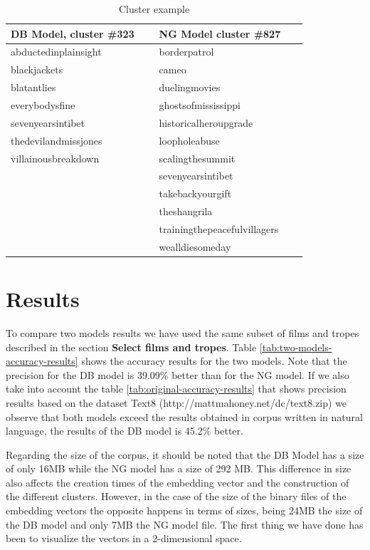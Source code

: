 \documentclass[letterpaper]{article}
\begin{document}
	
	\begin{table}[t]
	\centering
	\begin{tabular}{|p{0.45\linewidth}|p{0.45\linewidth}|}
	\hline
	\textbf{DB Model, cluster \#323} & \textbf{NG Model cluster \#827}\\
	\hline
	\hline
	abductedinplainsight  & borderpatrol \\
	blackjackets  & cameo \\
	blatantlies  & duelingmovies \\
	everybodysfine  & ghostsofmississippi \\
	sevenyearsintibet  & historicalheroupgrade \\
	thedevilandmissjones  & loopholeabuse  \\
	villainousbreakdown  & scalingthesummit  \\
	 & sevenyearsintibet \\
	 & takebackyourgift \\
	 & theshangrila \\
	 & trainingthepeacefulvillagers \\
	 & wealldiesomeday \\
\hline 

\end{tabular}
\caption{Cluster example}
\label{tab:cluster-example}
\end{table}    
	
	
	\section{Results}
	\label{sec:res}
	
	
    To compare two models results we have used the same subset of films and tropes described in the section \textbf{Select films and tropes}. 
    Table \ref{tab:two-models-accuracy-results} shows the accuracy results for the two models. Note that the precision for the DB model is 39.09\% better than for the NG model. 
    If we also take into account the table \ref{tab:original-accuracy-results} that shows precision results based on the dataset Text8 (http://mattmahoney.net/dc/text8.zip) we observe that both models exceed the results obtained in corpus written in natural language, the results of the DB model is 45.2\% better.
	
	
	Regarding the size of the corpus, it should be noted that the DB Model has a size of only 16MB while the NG model has a size of 292 MB. This difference in size also affects the creation times of the embedding vector and the construction of the different clusters. However, in the case of the size of the binary files of the embedding vectors the opposite happens in terms of sizes, being 24MB the size of the DB model and only 7MB the NG model file. The first thing we have done has been to visualize the vectors in a 2-dimensional space. 
\end{document}
